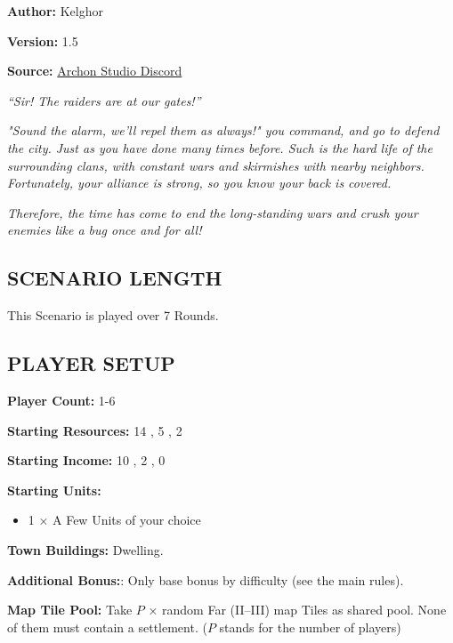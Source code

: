 
\begin{multicols}{2}

\textbf{Author:} Kelghor

\textbf{Version:} 1.5

\textbf{Source:} \href{https://discord.com/channels/740870068178649108/1313651865648369725}{Archon Studio Discord}

\textit{``Sir! The raiders are at our gates!''}

\textit{"Sound the alarm, we'll repel them as always!" you command, and go to defend the city. Just as you have done many times before. Such is the hard life of the surrounding clans, with constant wars and skirmishes with nearby neighbors. Fortunately, your alliance is strong, so you know your back is covered.}

\textit{Therefore, the time has come to end the long-standing wars and crush your enemies like a bug once and for all!}

\subsection*{\MakeUppercase{Scenario Length}}

This Scenario is played over 7 Rounds.

\subsection*{\MakeUppercase{Player Setup}}

\textbf{Player Count:} 1-6

\textbf{Starting Resources:} 14 , 5 , 2 

\textbf{Starting Income:} 10 , 2 , 0 

\textbf{Starting Units:}
\begin{itemize}
  \item  1 × A Few  Units of your choice
\end{itemize}

\textbf{Town Buildings:}  Dwelling.

\textbf{Additional Bonus:}: Only base bonus by difficulty (see the main rules).

\textbf{Map Tile Pool:} Take $P$ × random Far (II–III) map Tiles as shared pool. None of them must contain a settlement. ($P$ stands for the number of players)


\end{multicols}
